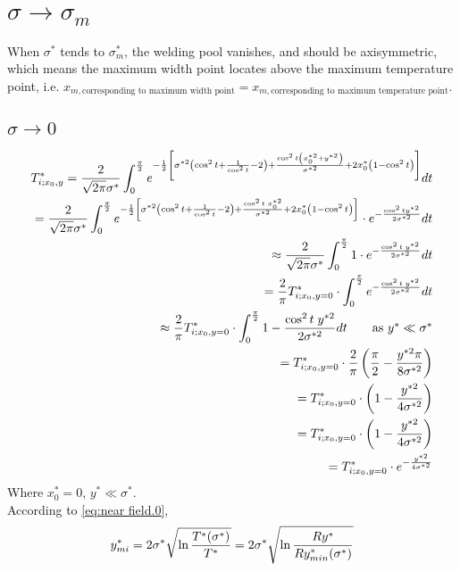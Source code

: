 \documentclass[review, 1p, number, sort&compress,table]{elsarticle}
\begin{document}
	\section{$\sigma\rightarrow{\sigma_m}$}
	When $\sigma^{*}$ tends to $\sigma^{*}_m$, the welding pool vanishes, and should be axisymmetric, which means the maximum width point locates above the maximum temperature point, i.e. $x_{m,\mbox{corresponding to maximum width point}}=x_{m,\mbox{corresponding to maximum temperature point}}$.
	\subsection{$\sigma\rightarrow{0}$}
		\begin{eqnarray}
		\nonumber
			T^{*}_{\uppercase\expandafter{\romannumeral1};x_0,y}=\frac{2}{\sqrt{2\pi}\sigma^*}\int_{0}^{\frac{\pi}{2}} e^{-\frac{1}{2}\left[\sigma^{*2}\left(\cos^2{t}+\frac{1}{\cos^2{t}}-2 \right)+\frac{\cos^2{t}\left(x^{*2}_0+y^{*2}\right) }{\sigma^{*2}}+2x^{*}_0\left( 1-\cos^2{t} \right)\right] }dt
			\\ \nonumber
			=\frac{2}{\sqrt{2\pi}\sigma^*}\int_{0}^{\frac{\pi}{2}} e^{-\frac{1}{2}\left[\sigma^{*2}\left(\cos^2{t}+\frac{1}{\cos^2{t}}-2 \right)+\frac{\cos^2{t}\;x^{*2}_0 }{\sigma^{*2}}+2x^{*}_0\left( 1-\cos^2{t} \right)\right]} \cdot e^{-\frac{\cos^2{t}y^{*2}}{2\sigma^{*2}}}dt
			\\ \nonumber	
			\approx \frac{2}{\sqrt{2\pi}\sigma^*}\int_{0}^{\frac{\pi}{2}} 1 \cdot e^{-\frac{\cos^2{t} \; y^{*2}}{2\sigma^{*2}}}dt
			 \\ \nonumber
			=\frac{2}{\pi}T^{*}_{\uppercase\expandafter{\romannumeral1};x_0,y=0} \cdot \int_{0}^{\frac{\pi}{2}} e^{-\frac{\cos^2{t} \; y^{*2}}{2\sigma^{*2}}}dt
			\\ \nonumber
			\approx \frac{2}{\pi}T^{*}_{\uppercase\expandafter{\romannumeral1};x_0,y=0} \cdot \int_{0}^{\frac{\pi}{2}} 1-\frac{\cos^2{t} \; y^{*2}}{2\sigma^{*2}}dt \quad \quad  \mbox{as $y^{*}\ll \sigma^{*}$}
			\\  \nonumber
			=	 T^{*}_{\uppercase\expandafter{\romannumeral1};x_0,y=0}\cdot
			 \frac{2}{\pi}\left(\frac{\pi}{2}-\frac{y^{*2}\pi}{8\sigma^{*2}}\right)
			\\ \nonumber
			=	 T^{*}_{\uppercase\expandafter{\romannumeral1};x_0,y=0}\cdot
			\left(1-\frac{y^{*2}}{4\sigma^{*2}}\right)
			\\ \nonumber
			=	 T^{*}_{\uppercase\expandafter{\romannumeral1};x_0,y=0}\cdot
			\left(1-\frac{y^{*2}}{4\sigma^{*2}}\right)
			\\ 
			=	 T^{*}_{\uppercase\expandafter{\romannumeral1};x_0,y=0}\cdot
			e^{-\frac{y^{*2}}{4\sigma^{*2}}} \label{eq:near field.0}
		\end{eqnarray}
	Where $x_0^{*}=0$, $y^{*}\ll \sigma^{*}$.  \\
	According to \autoref{eq:near field.0}, 
	\begin{equation} \label{eq:Sm.0}
		y_{m\uppercase\expandafter{\romannumeral1}}^{*} = 2\sigma^{*}\sqrt{\ln{\frac{T^{*}(\sigma^{*})}{T^{*}}}}=2\sigma^{*}\sqrt{\ln{\frac{Ry^{*}}{Ry_{min}^{*}(\sigma^{*})}}}
	\end{equation}
\end{document}
